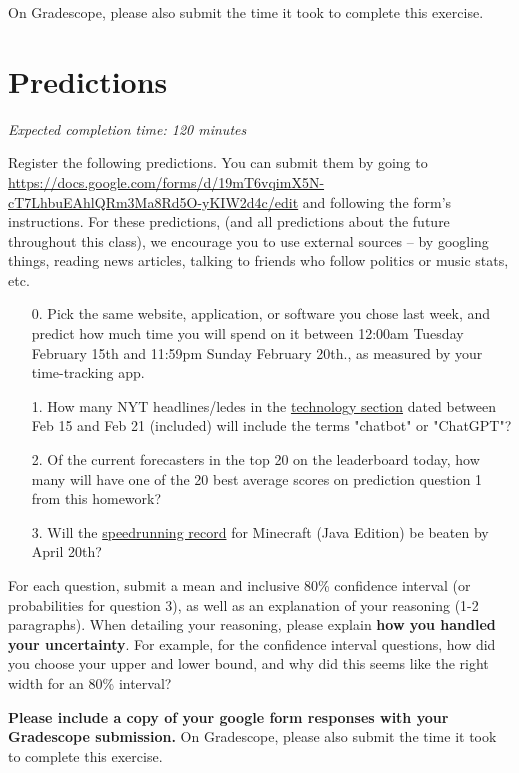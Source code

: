 \documentclass[11pt]{article}
\begin{document}
On Gradescope, please also submit the time it took to complete this exercise.

\section*{Predictions}

\emph{Expected completion time: 120 minutes}

Register the following predictions. You can submit them by going to \url{https://docs.google.com/forms/d/19mT6vqimX5N-cT7LhbuEAhlQRm3Ma8Rd5O-yKIW2d4c/edit} and following the form's instructions. For these predictions, (and all predictions about the future throughout this class), we encourage you to use external sources -- by googling things, reading news articles, talking to friends who follow politics or music stats, etc.

\begin{enumerate}
	\item[0.] Pick the same website, application, or software you chose last week, and predict how much time you will spend on it between 12:00am Tuesday February 15th and 11:59pm Sunday February 20th., as measured by your time-tracking app.
	\item[1.] How many NYT headlines/ledes in the \href{https://www.nytimes.com/section/technology}{technology section} dated between Feb 15 and Feb 21 (included) will include the terms "chatbot" or "ChatGPT"?
	\item[2.] Of the current forecasters in the top 20 on the leaderboard today, how many will have one of the 20 best average scores on prediction question 1 from this homework?
	\item[3.] Will the \href{https://www.speedrun.com/mc?h=Any_Glitchless-Random_Seed-1.16&x=mkeyl926-r8rg67rn.21d4zvp1-wl33kewl.4qye4731}{speedrunning record} for Minecraft (Java Edition) be beaten by April 20th?
\end{enumerate}

For each question, submit a mean and inclusive 80\% confidence interval (or probabilities for question 3), as well as an explanation of your reasoning (1-2 paragraphs). When detailing your reasoning, please explain \textbf{how you handled your uncertainty}. For example, for the confidence interval questions, how did you choose your upper and lower bound, and why did this seems like the right width for an 80\% interval?

\textbf{Please include a copy of your google form responses with your Gradescope submission.} On Gradescope, please also submit the time it took to complete this exercise.
\end{document}
